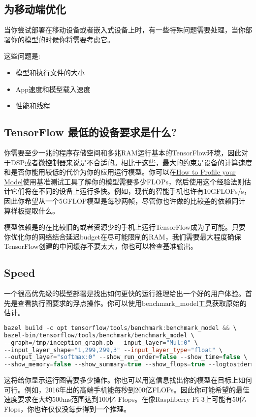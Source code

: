 \subsection{为移动端优化}
当你尝试部署在移动设备或者嵌入式设备上时，有一些特殊问题需要处理，当你部署你的模型的时候你将需要考虑它。

这些问题是:
\begin{itemize}
\item 模型和执行文件的大小
\item App速度和模型载入速度
\item 性能和线程
\end{itemize}
\subsection{TensorFlow 最低的设备要求是什么?}
你需要至少一兆的程序存储空间和多兆RAM运行基本的TensorFlow环境，因此对于DSP或者微控制器来说是不合适的。相比于这些，最大的约束是设备的计算速度和是否你能用较低的代价为你的应用运行模型。你可以在\href{https://www.tensorflow.org/mobile/optimizing?hl=zh-cn#how_to_profile_your_model}{How to Profile your Model}使用基准测试工具了解你的模型需要多少FLOPs，然后使用这个经验法则估计它们将在不同的设备上运行多快。例如，现代的智能手机也许有10GFLOPs/s，因此你希望从一个5GFLOP模型是每秒两帧，尽管你也许做的比较差的依赖同计算样板提取什么。

模型依赖是的在比较旧的或者资源少的手机上运行TensorFlow成为了可能。只要你优化你的网络结合延迟budget在尽可能限制的RAM，我们需要最大程度确保TensorFlow创建的中间缓存不要太大，你也可以检查基准输出。

\subsection{Speed}
一个很高优先级的模型部署是找出如何更快的运行推理给出一个好的用户体验。首先是查看执行图要求的浮点操作。你可以使用benchmark\_model工具获取原始的估计。
\begin{lstlisting}[language=C++]
bazel build -c opt tensorflow/tools/benchmark:benchmark_model && \
bazel-bin/tensorflow/tools/benchmark/benchmark_model \
--graph=/tmp/inception_graph.pb --input_layer="Mul:0" \
--input_layer_shape="1,299,299,3" --input_layer_type="float" \
--output_layer="softmax:0" --show_run_order=false --show_time=false \
--show_memory=false --show_summary=true --show_flops=true --logtostderr
\end{lstlisting}
这将给你显示运行图需要多少操作。你也可以用这信息找出你的模型在目标上如何可行。例如，2016年出的高端手机能每秒到200亿FLOPs。因此你可能希望的最佳速度要求在大约500ms范围达到100亿 Flops。在像Rasphberry Pi 3上可能有50亿Flops，你也许仅仅没每步得到一个推理。

